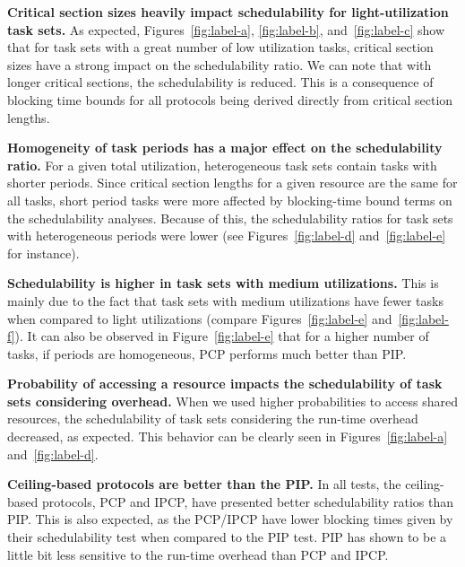 \textbf{Critical section sizes heavily impact schedulability for 
light-utilization task sets.} As expected, Figures~\ref{fig:label-a}, 
\ref{fig:label-b}, and~\ref{fig:label-c} show that for task sets with a great 
number of low utilization tasks, critical section sizes have a strong impact on 
the schedulability ratio. We can note that with longer critical sections, the 
schedulability is reduced. This is a consequence of blocking time bounds for all 
protocols being derived directly from critical section lengths.

\textbf{Homogeneity of task periods has a major effect on the schedulability ratio.}
For a given total utilization, heterogeneous task sets contain tasks with 
shorter periods. Since critical section lengths for a given resource are the 
same for all tasks, short period tasks were more affected by blocking-time 
bound terms on the schedulability analyses. Because of this, the schedulability 
ratios for task sets with heterogeneous periods were lower (see 
Figures~\ref{fig:label-d} and~\ref{fig:label-e} for instance).

\textbf{Schedulability is higher in task sets with medium utilizations.} This 
is mainly due to the fact that task sets with medium utilizations have fewer 
tasks when compared to light utilizations (compare Figures~\ref{fig:label-e} 
and~\ref{fig:label-f}). It can also be observed in Figure~\ref{fig:label-e} that 
for a higher number of tasks, if periods are homogeneous, PCP performs much 
better than PIP.

\textbf{Probability of accessing a resource impacts the schedulability of task 
sets considering overhead.} When we used higher probabilities to access shared 
resources, the schedulability of task sets considering the run-time overhead 
decreased, as expected. This behavior can be clearly seen in 
Figures~\ref{fig:label-a} and~\ref{fig:label-d}.

\textbf{Ceiling-based protocols are better than the PIP.} In all tests, the 
ceiling-based protocols, PCP and IPCP, have presented better schedulability 
ratios than PIP. This is also expected, as the PCP/IPCP have lower blocking 
times given by their schedulability test when compared to the PIP test. PIP has 
shown to be a little bit less sensitive to the run-time overhead than PCP and 
IPCP.

